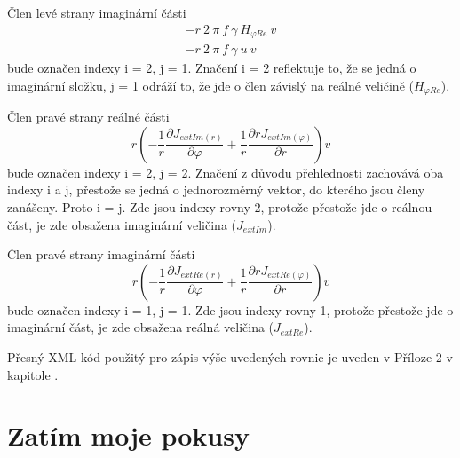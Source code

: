 \documentclass[12pt,a4paper,oneside]{article}
\numberwithin{equation}{section} %
\numberwithin{figure}{section} %
\numberwithin{table}{section} %
\begin{document}
Člen levé strany imaginární části
\begin{subequations}
\begin{gather}
- r ~ 2 ~ \pi ~ f ~ \gamma ~ H _{\varphi Re} ~ v
\\
- r ~ 2 ~ \pi ~ f ~ \gamma ~ u ~ v
\end{gather}
\end{subequations}
bude označen indexy i = 2, j = 1. Značení i = 2 reflektuje to, že se jedná o imaginární složku, j = 1 odráží to, že jde o člen závislý na reálné veličině ($H _{\varphi Re}$).

Člen pravé strany reálné části
\begin{equation}
r \left( - \frac{1}{r} \frac{\partial J _{extIm(r)}}{\partial \varphi} + \frac{1}{r} \frac{\partial r J _{extIm(\varphi)}}{\partial r} \right) v
\end{equation}
bude označen indexy i = 2, j = 2. Značení z důvodu přehlednosti zachovává oba indexy i a j, přestože se jedná o jednorozměrný vektor, do kterého jsou členy zanášeny. Proto i = j. Zde jsou indexy rovny 2, protože přestože jde o reálnou část, je zde obsažena imaginární veličina ($J _{extIm}$).

Člen pravé strany imaginární části
\begin{equation}
r \left( - \frac{1}{r} \frac{\partial J _{extRe(r)}}{\partial \varphi} + \frac{1}{r} \frac{\partial r J _{extRe(\varphi)}}{\partial r} \right)  v
\end{equation}
bude označen indexy i = 1, j = 1. Zde jsou indexy rovny 1, protože přestože jde o imaginární část, je zde obsažena reálná veličina ($J _{extRe}$).

Přesný XML kód použitý pro zápis výše uvedených rovnic je uveden v Příloze 2 v kapitole .



\clearpage
\section{Zatím moje pokusy}
\end{document}

